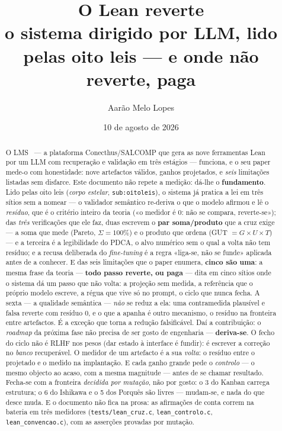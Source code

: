 \documentclass[11pt,a4paper]{article}
\title{\textbf{O Lean reverte}\\[3pt]
  {\large o sistema dirigido por LLM, lido pelas oito leis --- e onde não reverte, paga}}
\author{Aarão Melo Lopes}
\date{10 de agosto de 2026}
\newcommand{\code}[1]{\texttt{\small #1}}
\begin{document}
\maketitle

\begin{abstract}
\noindent O LMS~\cite{lms} --- a plataforma Conecthus/SALCOMP que gera as nove ferramentas Lean por um
LLM com recuperação e validação em três estágios --- funciona, e o seu paper mede-o com honestidade:
nove artefactos válidos, ganhos projetados, e \emph{seis} limitações listadas sem disfarce. Este documento
não repete a medição: dá-lhe o \textbf{fundamento}. Lido pelas oito leis
(\emph{corpo estelar}, \code{sub:oitoleis}), o sistema já pratica a lei em três sítios sem a nomear ---
o validador semântico re-deriva o que o modelo afirmou e lê o \emph{resíduo}, que é o critério inteiro
da teoria («o medidor é $0$: não se compara, reverte-se»); das \emph{três} verificações que ele faz,
duas escrevem o \textbf{par soma/produto} que a cruz exige --- a soma que mede (Pareto,
$\Sigma=100\%$) e o produto que ordena (GUT $=G\times U\times T$) --- e a terceira é a legibilidade do
PDCA, o alvo numérico sem o qual a volta não tem resíduo; e a recusa deliberada do \emph{fine-tuning}
é a regra «liga-se, não se funde» aplicada antes de a conhecer. E das seis limitações que o paper
enumera, \textbf{cinco são uma}: a mesma frase da teoria --- \textbf{todo passo reverte, ou paga} ---
dita em cinco sítios onde o sistema dá um passo que não volta: a projeção sem medida, a referência que
o próprio modelo escreve, a régua que vive só no prompt, o ciclo que nunca fecha. A sexta --- a
qualidade semântica --- \emph{não} se reduz a ela: uma contramedida plausível e falsa reverte com
resíduo $0$, e o que a apanha é outro mecanismo, o resíduo na fronteira entre artefactos. É a exceção
que torna a redução falsificável. Daí a
contribuição: o \emph{roadmap} da próxima fase não precisa de ser gosto de engenharia --- \textbf{deriva-se}.
O fecho do ciclo não é RLHF nos pesos (dar estado à interface é fundir): é escrever a correção no
\emph{banco} recuperável. O medidor de um artefacto é a sua \emph{volta}: o resíduo entre o projetado e o
medido na implantação. E cada ganho grande pede o \emph{controlo} --- o mesmo objecto ao acaso, com a mesma
magnitude --- antes de se chamar resultado. Fecha-se com a fronteira \emph{decidida por mutação}, não
por gosto: o 3 do Kanban carrega estrutura; o 6 do Ishikawa e o 5 dos Porquês são livres --- mudam-se,
e nada do que desce muda. E o documento não fica na prosa: as afirmações de conta correm na bateria em
três medidores (\code{tests/lean\_cruz.c}, \code{lean\_controlo.c}, \code{lean\_convencao.c}), com as
asserções provadas por mutação.
\end{abstract}
\end{document}
